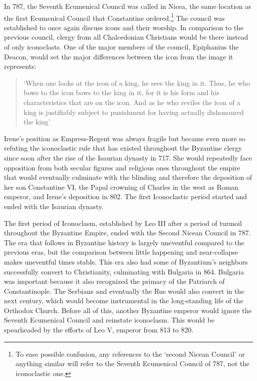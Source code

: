 \documentclass[12pt]{article}
\begin{document}
    In 787, the Seventh Ecumenical Council was called in Nicea, the same location as the first Ecumenical Council that Constantine ordered.\footnote{To ease possible confusion, any references to the  `second Nicean Council' or anything similar will refer to the Seventh Ecumenical Council of 787, not the iconoclastic one.}
    The council was established to once again discuss icons and their worship. In comparison to the previous council, clergy from all Chalcedonian Christians would be there instead of only iconoclasts. One of the major members of the council, Epiphanius the Deacon, would set the major differences between the icon from the image it represents: \begin{quote}
         `When one looks at the icon of a king, he sees the king in it. Thus, he who bows to the icon bows to the king in it, for it is his form and his characteristics that are on the icon. And as he who reviles the icon of a king is justifiably subject to punishment for having actually dishonoured the king' ~\cite[p. 129]{IconIdolatry}
    \end{quote}\noindent
    Irene's position as Empress-Regent was always fragile but became even more so refuting the iconoclastic rule that has existed throughout the Byzantine clergy since soon after the rise of the Isaurian dynasty in 717. She would repeatedly face opposition from both secular figures and religious ones throughout the empire that would eventually culminate with the blinding and therefore the deposition of her son Constantine VI, the Papal crowning of Charles in the west as Roman emperor, and Irene's deposition in 802. The first Iconoclastic period started and ended with the Isaurian dynasty. \

    The first period of Iconoclasm, established by Leo III after a period of turmoil throughout the Byzantine Empire, ended with the Second Nicean Council in 787. The era that follows in Byzantine history is largely uneventful compared to the previous eras, but the comparison between little happening and near-collapse makes uneventful times stable. This era also had some of Byzantium's neighbors successfully convert to Christianity, culminating with Bulgaria in 864.\cite[p.12]{BriefByzantine} Bulgaria was important because it also recognized the primacy of the Patriarch of Constantinople. The Serbians and eventually the Rus would also convert in the next century, which would become instrumental in the long-standing life of the Orthodox Church. Before all of this, another Byzantine emperor would ignore the Seventh Ecumenical Council and reinstate iconoclasm. This would be spearheaded by the efforts of Leo V, emperor from 813 to 820. \
\end{document}
